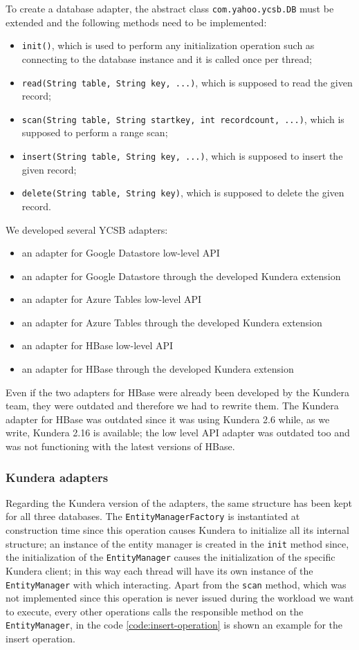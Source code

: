 \noindent To create a database adapter, the abstract class \texttt{com.yahoo.ycsb.DB} must be extended and the following methods need to be implemented:
\begin{itemize}
\item \texttt{init()}, which is used to perform any initialization operation such as connecting to the database instance and it is called once per thread;
\item \texttt{read(String table, String key, ...)}, which is supposed to read the given record;
\item \texttt{scan(String table, String startkey, int recordcount, ...)}, which is supposed to perform a range scan;
\item \texttt{insert(String table, String key, ...)}, which is supposed to insert the given record;
\item \texttt{delete(String table, String key)}, which is supposed to delete the given record.
\end{itemize}

\newparagraph We developed  several YCSB adapters:
\begin{itemize}
\item an adapter for Google Datastore low-level API
\item an adapter for Google Datastore through the developed Kundera extension
\item an adapter for Azure Tables low-level API
\item an adapter for Azure Tables through the developed Kundera extension
\item an adapter for HBase low-level API
\item an adapter for HBase through the developed Kundera extension
\end{itemize}
\noindent Even if the two adapters for HBase were already been developed by the Kundera team, they were outdated and therefore we had to rewrite them. The Kundera adapter for HBase was outdated since it was using Kundera 2.6 while, as we write, Kundera 2.16 is available; the low level API adapter was outdated too and was not functioning with the latest versions of HBase.

\subsubsection{Kundera adapters}
Regarding the Kundera version of the adapters, the same structure has been kept for all three databases. The \texttt{EntityManagerFactory} is instantiated at construction time since this operation causes Kundera to initialize all its internal structure; an instance of the entity manager is created in the \texttt{init} method since, the initialization of the \texttt{EntityManager} causes the initialization of the specific Kundera client; in this way each thread will have its own instance of the \texttt{EntityManager} with which interacting.
Apart from the \texttt{scan} method, which was not implemented since this operation is never issued during the workload we want to execute, every other operations calls the responsible method on the \texttt{EntityManager}, in the code \ref{code:insert-operation} is shown an example for the insert operation.

